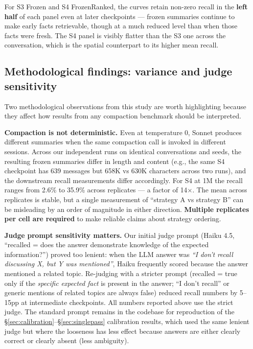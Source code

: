 For S3 Frozen and S4 FrozenRanked, the curves retain non-zero recall in
the \textbf{left half} of each panel even at later checkpoints --- frozen
summaries continue to make early facts retrievable, though at a much
reduced level than when those facts were fresh. The S4 panel is visibly
flatter than the S3 one across the conversation, which is the spatial
counterpart to its higher mean recall.

\subsection{Methodological findings: variance and judge sensitivity}
\label{sec:methodological}

Two methodological observations from this study are worth highlighting
because they affect how results from any compaction benchmark should be
interpreted.

\textbf{Compaction is not deterministic.} Even at temperature 0, Sonnet produces
different summaries when the same compaction call is invoked in different
sessions. Across our independent runs on identical conversations and seeds,
the resulting frozen summaries differ in length and content (e.g., the same
S4 checkpoint has 639 messages but 658K vs 630K characters across two
runs), and the downstream recall measurements differ accordingly. For S4
at 1M the recall ranges from 2.6\% to 35.9\% across replicates --- a factor of
14$\times$. The mean across replicates is stable, but a single measurement of
``strategy A vs strategy B'' can be misleading by an order of magnitude in
either direction. \textbf{Multiple replicates per cell are required} to make
reliable claims about strategy ordering.

\textbf{Judge prompt sensitivity matters.} Our initial judge prompt (Haiku 4.5,
``recalled = does the answer demonstrate knowledge of the expected
information?'') proved too lenient: when the LLM answer was \textit{``I don't recall
discussing X, but Y was mentioned''}, Haiku frequently scored
 because the answer mentioned a related topic. Re-judging
with a stricter prompt (recalled = true only if the \textit{specific expected
fact} is present in the answer; ``I don't recall'' or generic mentions of
related topics are always false) reduced recall numbers by 5--15pp at
intermediate checkpoints. All numbers reported above use the strict judge.
The standard prompt remains in the codebase for reproduction of the
\S\ref{sec:calibration}--\S\ref{sec:singlepass}
calibration results, which used the same lenient judge but where the
looseness has less effect because answers are either clearly correct or
clearly absent (less ambiguity).

